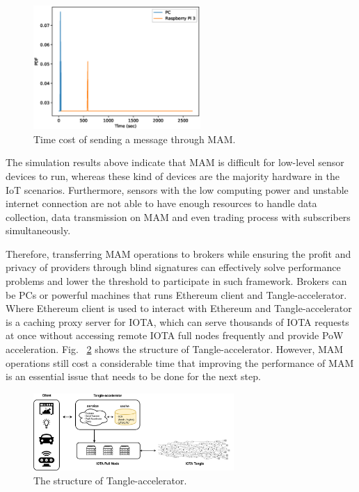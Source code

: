 \documentclass[conference]{IEEEtran}
\begin{document}
\begin{figure}[!t]
    \centering
    \includegraphics[width=2.5in]{mam_send}
    \caption{Time cost of sending a message through MAM.}
    \label{fig:mam_send}
\end{figure}

The simulation results above indicate that MAM is difficult for low-level sensor devices to run, whereas these kind of devices are the majority hardware in the IoT scenarios. Furthermore, sensors with the low computing power and unstable internet connection are not able to have enough resources to handle data collection, data transmission on MAM and even trading process with subscribers simultaneously. 

Therefore, transferring MAM operations to brokers while ensuring the profit and privacy of providers through blind signatures can effectively solve performance problems and lower the threshold to participate in such framework. Brokers can be PCs or powerful machines that runs Ethereum client and Tangle-accelerator\cite{TA}. Where Ethereum client is used to interact with Ethereum and Tangle-accelerator is a caching proxy server for IOTA, which can serve thousands of IOTA requests at once without accessing remote IOTA full nodes frequently and provide PoW acceleration. Fig.~ \ref{fig:ta_struct} shows the structure of Tangle-accelerator. However, MAM operations still cost a considerable time that improving the performance of MAM is an essential issue that needs to be done for the next step.  

\begin{figure}[!t]
    \centering
    \includegraphics[width=3in]{ta_structure}
    \caption{The structure of Tangle-accelerator.}
    \label{fig:ta_struct}
\end{figure}
\end{document}
